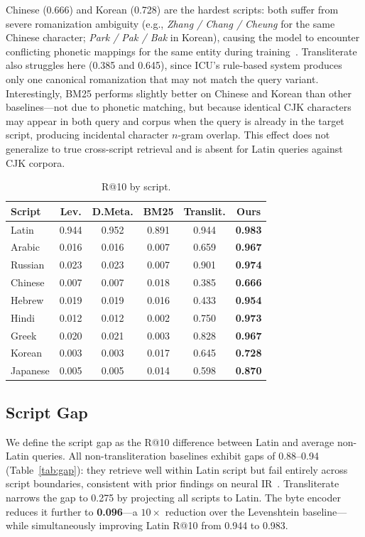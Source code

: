 \documentclass[sigconf]{acmart}
\begin{document}
Chinese (0.666) and Korean (0.728) are the hardest scripts: both suffer from severe romanization ambiguity (e.g., \textit{Zhang / Chang / Cheung} for the same Chinese character; \textit{Park / Pak / Bak} in Korean), causing the model to encounter conflicting phonetic mappings for the same entity during training~\cite{chari2025lost}. Transliterate also struggles here (0.385 and 0.645), since ICU's rule-based system produces only one canonical romanization that may not match the query variant. Interestingly, BM25 performs slightly better on Chinese and Korean than other baselines---not due to phonetic matching, but because identical CJK characters may appear in both query and corpus when the query is already in the target script, producing incidental character $n$-gram overlap. This effect does not generalize to true cross-script retrieval and is absent for Latin queries against CJK corpora.

\begin{table}[h]
\centering
\caption{R@10 by script.}
\label{tab:script}
\begin{tabular}{lccccc}
\toprule
Script & Lev. & D.Meta. & BM25 & Translit. & Ours \\
\midrule
Latin   & 0.944 & 0.952 & 0.891 & 0.944 & \textbf{0.983} \\
Arabic  & 0.016 & 0.016 & 0.007 & 0.659 & \textbf{0.967} \\
Russian & 0.023 & 0.023 & 0.007 & 0.901 & \textbf{0.974} \\
Chinese & 0.007 & 0.007 & 0.018 & 0.385 & \textbf{0.666} \\
Hebrew  & 0.019 & 0.019 & 0.016 & 0.433 & \textbf{0.954} \\
Hindi   & 0.012 & 0.012 & 0.002 & 0.750 & \textbf{0.973} \\
Greek   & 0.020 & 0.021 & 0.003 & 0.828 & \textbf{0.967} \\
Korean  & 0.003 & 0.003 & 0.017 & 0.645 & \textbf{0.728} \\
Japanese& 0.005 & 0.005 & 0.014 & 0.598 & \textbf{0.870} \\
\bottomrule
\end{tabular}
\end{table}

\subsection{Script Gap}

We define the script gap as the R@10 difference between Latin and average non-Latin queries.
All non-transliteration baselines exhibit gaps of 0.88--0.94 (Table~\ref{tab:gap}): they retrieve well
within Latin script but fail entirely across script boundaries, consistent with prior
findings on neural IR~\cite{chari2025lost}. Transliterate narrows the gap to 0.275 by
projecting all scripts to Latin. The byte encoder reduces it further to \textbf{0.096}---a
$10\times$ reduction over the Levenshtein baseline---while simultaneously improving Latin
R@10 from 0.944 to 0.983.
\end{document}
